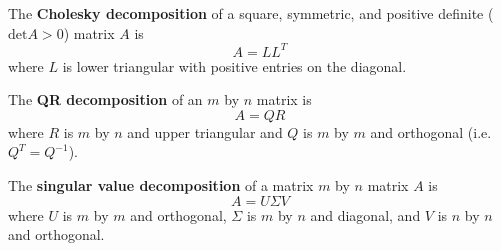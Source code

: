 \documentclass[compress]{beamer}
\renewcommand{\det}{\mathrm{det}}
\theoremstyle{definition}
\begin{document}
\begin{frame}  
  \begin{definition}
    The \textbf{Cholesky decomposition} of a square, symmetric, and
    positive definite ($\det A > 0$) matrix $A$ is
    \[ A = L L^T \] 
    where $L$ is lower triangular with positive entries on the
    diagonal. 
  \end{definition}
\end{frame}

\begin{frame}  
\begin{definition}
  The \textbf{QR decomposition} of an $m$ by $n$ matrix is 
  \[ A = QR \]
  where $R$ is $m$ by $n$ and upper triangular and $Q$ is $m$ by $m$
  and orthogonal (i.e.\ $Q^T = Q^{-1}$).
\end{definition}
\end{frame}

\begin{frame}  
\begin{definition}
  The \textbf{singular value decomposition} of a matrix $m$ by $n$
  matrix $A$ is
  \[ A = U \Sigma V \]
  where $U$ is $m$ by $m$ and orthogonal, $\Sigma$ is $m$ by $n$ and
  diagonal, and $V$ is $n$ by $n$ and orthogonal.
\end{definition}
\end{frame}
\end{document}
